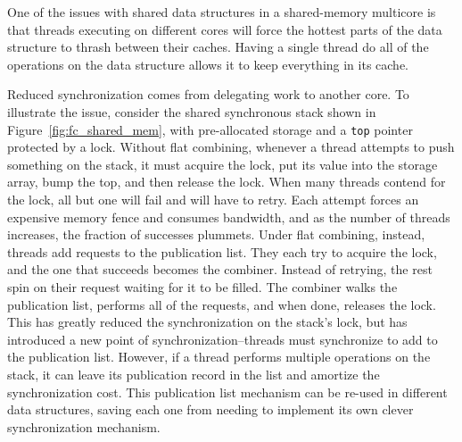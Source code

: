 One of the issues with shared data structures in a shared-memory multicore is that threads executing on different cores will force the hottest parts of the data structure to thrash between their caches. Having a single thread do all of the operations on the data structure allows it to keep everything in its cache.



Reduced synchronization comes from delegating work to another core.
To illustrate the issue, consider the shared synchronous stack shown in Figure~\ref{fig:fc_shared_mem}, with pre-allocated storage and a \texttt{top} pointer protected by a lock. Without flat combining, whenever a thread attempts to push something on the stack, it must acquire the lock, put its value into the storage array, bump the top, and then release the lock. When many threads contend for the lock, all but one will fail and will have to retry. Each attempt forces an expensive memory fence and consumes bandwidth, and as the number of threads increases, the fraction of successes plummets. Under flat combining, instead, threads add requests to the publication list. They each try to acquire the lock, and the one that succeeds becomes the combiner. Instead of retrying, the rest spin on their request waiting for it to be filled. The combiner walks the publication list, performs all of the requests, and when done, releases the lock. This has greatly reduced the synchronization on the stack's lock, but has introduced a new point of synchronization--threads must synchronize to add to the publication list. However, if a thread performs multiple operations on the stack, it can leave its publication record in the list and amortize the synchronization cost. This publication list mechanism can be re-used in different data structures, saving each one from needing to implement its own clever synchronization mechanism.

